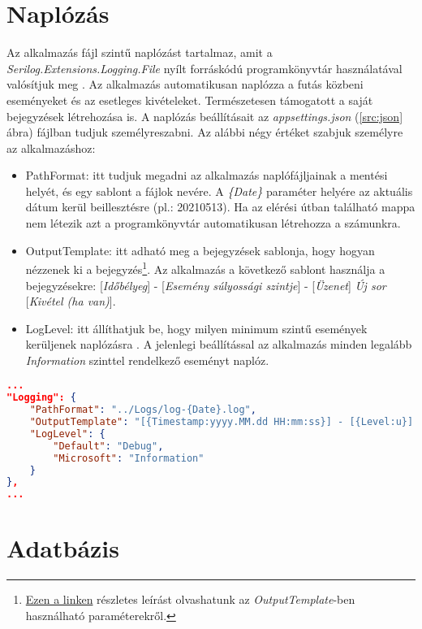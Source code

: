 \section{Naplózás}
\label{sec:log}
Az alkalmazás fájl szintű naplózást tartalmaz, amit a \emph{Serilog.Extensions.Logging.File} nyílt forráskódú programkönyvtár használatával valósítjuk meg \cite{SERILOG}. Az alkalmazás automatikusan naplózza a futás közbeni eseményeket és az esetleges kivételeket. Természetesen támogatott a saját bejegyzések létrehozása is. A naplózás beállításait az \emph{appsettings.json} (\ref{src:json} ábra) fájlban tudjuk személyreszabni. Az alábbi négy értéket szabjuk személyre az alkalmazáshoz:
\begin{itemize}
	\item PathFormat: itt tudjuk megadni az alkalmazás naplófájljainak a mentési helyét, és egy sablont a fájlok nevére. A \emph{\{Date\}} paraméter helyére az aktuális dátum kerül beillesztésre (pl.: 20210513). Ha az elérési útban található mappa nem létezik azt a programkönyvtár automatikusan létrehozza a számunkra.
	\item OutputTemplate: itt adható meg a bejegyzések sablonja, hogy hogyan nézzenek ki a bejegyzés\footnote{\href{https://github.com/serilog/serilog/wiki/Formatting-Output}{Ezen a linken} részletes leírást olvashatunk az \emph{OutputTemplate}-ben használható paraméterekről.}. Az alkalmazás a következő sablont használja a bejegyzésekre: [\emph{Időbélyeg}] - [\emph{Esemény súlyossági szintje}] - [\emph{Üzenet}] \emph{Új sor} [\emph{Kivétel (ha van)}].
	\item LogLevel: itt állíthatjuk be, hogy milyen minimum szintű események kerüljenek naplózásra \cite{LogLevels}. A jelenlegi beállítással az alkalmazás minden legalább \emph{Information} szinttel rendelkező eseményt naplóz.
\end{itemize}
{}
\begin{lstlisting}[language=json]
...
"Logging": {
	"PathFormat": "../Logs/log-{Date}.log",
	"OutputTemplate": "[{Timestamp:yyyy.MM.dd HH:mm:ss}] - [{Level:u}] - {Message}{NewLine}{Exception}",
	"LogLevel": {
		"Default": "Debug",
		"Microsoft": "Information"
	}
},
...
\end{lstlisting}
\section{Adatbázis}
\label{sec:database}
